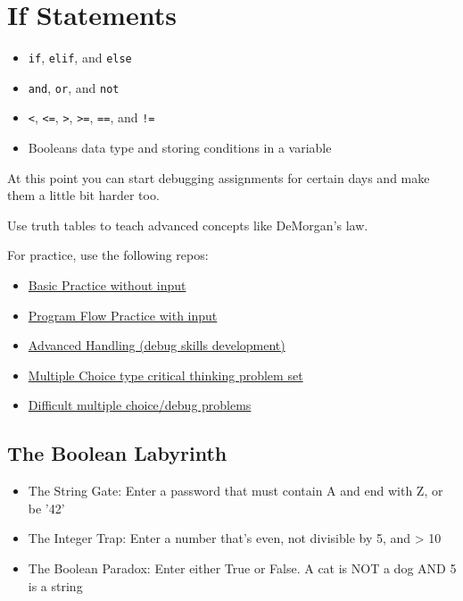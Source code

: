 \documentclass{article}
\begin{document}
\section{If Statements}

\begin{itemize}
    \item \verb|if|, \verb|elif|, and \verb|else|
    \item \verb|and|, \verb|or|, and \verb|not|
    \item \verb|<|, \verb|<=|, \verb|>|, \verb|>=|, \verb|==|, and \verb|!=|
    \item Booleans data type and storing conditions in a variable
\end{itemize}

At this point you can start debugging assignments for certain days and make them a little bit harder too.

Use truth tables to teach advanced concepts like DeMorgan's law.

For practice, use the following repos:


\begin{itemize}
    \item \href{https://github.com/codeabode101/vars-print-basic-if-practice}{Basic Practice without input}
    \item \href{https://github.com/codeabode101/program-flow-practice}{Program Flow Practice with input}
    \item \href{https://github.com/codeabode101/basic-types-advanced-handling-practice}{Advanced Handling (debug skills development)}
    \item \href{https://github.com/codeabode101/critical-thinking-if-vars-practice}{Multiple Choice type critical thinking problem set}
    \item \href{https://runestone.academy/ns/books/published/csawesome/Unit3-If-Statements/Exercises.html}{ Difficult multiple choice/debug problems}
\end{itemize}


\subsection{The Boolean Labyrinth}
\begin{itemize}
    \item The String Gate: Enter a password that must contain A and end with Z, or be '42'
    \item The Integer Trap: Enter a number that's even, not divisible by 5, and > 10
    \item The Boolean Paradox: Enter either True or False. A cat is NOT a dog AND 5 is a string
\end{itemize}
\end{document}

